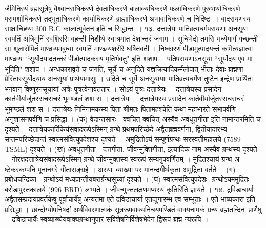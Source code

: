 जैमिनिरयं ब्रह्मसूत्रेषु वैश्वानराधिकरणे देवताधिकरणे बालाक्यधिकरणे फलाधिकरणे पुरुषार्थाधिकरणे परामर्शाधिकरणे तद्भूताधिकरणे कार्याधिकरणे ब्राह्माधिकरणे अभावाधिकरणे च निर्दिष्टः । बादरायणस्य साक्षाच्छिष्यः 300 B.C कालात्पूर्वतन इति च सिद्धान्तः ।
१३. दत्तात्रेयः
पातिव्रत्यधर्मपरायणा अनसूया स्वपतिं अत्रिमुनिं स्वशिरसि वहन्ती निशीथे स्वाश्रमात् देशान्तरं जगाम । सूचिभेद्ये तमसि मध्येमार्गं गच्छन्ती सा शूलारोपितं माण्ढव्यमबुध्वा स्वपतिं माण्ढव्यशरीरे घर्षितवती । निष्कारणं पीडामुत्पादयन्तं कमित्यज्ञात्वा माण्ढव्यः ``सूर्योदयादतन्तरं पीडोत्पादकस्य मृतिर्भवतु" इति शशाप । पतिपरायणाऽनसूया ``सूर्योदय एव मा भूदिति" शशाप । अन्धकारावृते च जगति, सूर्ये च अनुदिते यज्ञक्रियादिकर्मलोपात् भीताः देवाः ब्रह्मणा प्रेरितास्सूर्योदयाय अनसूयां प्रार्थयामासुः । उदिते च सूर्ये अनसूयायाः पातिव्रत्यधर्मेण तुष्टेन इन्द्रेण प्रार्थितः भगवान् विष्णुरनसूयायां अत्रेः पुत्रत्वेनावततार । सोऽयं पुत्रः दत्तात्रेयः । दत्तात्रेयस्य प्रसादेन कार्तवीर्यार्जुतस्सचराचरं भूमण्डलं शश स । दत्तात्रेयः । दत्तात्रेयस्य प्रसादेन कार्तवीर्यार्जुतस्सचराचरं भूमण्डलं शश स । दत्तात्रेयः निमिनामकस्य पिता श्रीमतः पितामहश्चेति कथा महाभारते सभापर्वणि अनुशासनपर्वणि च प्रसिद्धा ।
(क) वेदान्तसारः -
क्वचित् क्वचित् अस्यैव अवधूतगीता इति नामान्तरमिति च दृश्यते । दत्तात्रेयकार्तिकेयंसवादरूपेऽस्मिन् ग्रन्थे प्रथमपरिच्छेदे अद्वैतब्रह्मवर्णना, द्वितीयादारभ्य सप्तमपरिच्छेदान्तं स्वात्मसंवित्युपदेशश्च दृश्यते । अमुद्रितोऽयं सम्पूर्णग्रन्थः सरस्वतीमहालये (7589 TSML) दृश्यते ।
(ख) अवधूतगीता -
दत्तगीता, जीवन्मुक्तिगीता, इत्यादिकं नाम अस्यैव ग्रन्थस्य दृश्यते । गोरक्षदत्तात्रेयसंवादरूपेऽस्मिन् ग्रन्थे जीवन्मुक्तस्य स्वरूपं सम्यगुपवर्णितम् । मुद्रितश्चायं ग्रन्थ अ ष्टेकरकम्पनि पूनानगरे गीतासङ्ग्रहे । अस्याः व्याख्या पर मानन्दगीर्थकृता अमुद्रिता वर्तते ।
(ग) प्रबोधचन्द्रिका -
ग्रन्थोऽयं मध्यप्रान्तीयबरार्ग्रन्थसूच्यां दृश्यते ।
(घ) स्वात्मसंवित्युपदेशः-
ग्रन्थोऽयममुद्रितः बरोडापुस्तकालये (996 BRD) लभ्यते । जीवन्मुक्तलक्षणमप्यस्य कृतिरिति ज्ञायते ।
१४. द्रविडाचार्याः
अद्वैतसम्प्रदायप्रवर्तकेषु पूर्वाचार्येषु अन्यतमा एते द्रविडाचार्या एतद्युगारम्भ एव सम्भूताः । एते भाष्यकारा इति प्रसिद्धाः । छान्दोग्योपनिषदां अर्थविवरणात्मकं सूत्ररूपवाक्यनिचयपण्डितं वाक्यनामकं ग्रन्थं ब्रह्मतन्दिनः प्राणैषु । द्रविडाचार्यैः स्वव्याख्येयवाक्यग्रन्थानुपारं सविशेषनिर्विशेषभेदेन द्विरूपं ब्रह्म न्यरूपि ।
